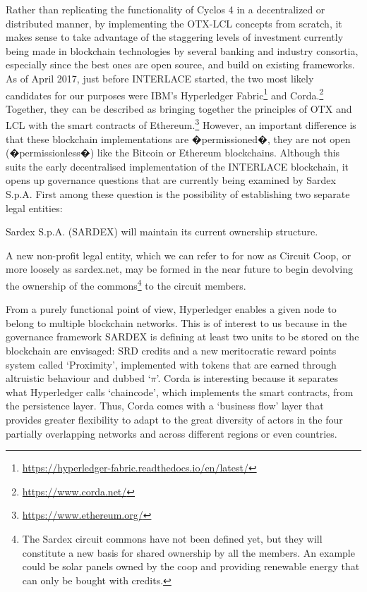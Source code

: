 Rather than replicating the functionality of Cyclos 4 in a decentralized or distributed manner, by implementing the OTX-LCL concepts from scratch, it makes sense to take advantage of the staggering levels of investment currently being made in blockchain technologies by several banking and industry consortia, especially since the best ones are open source, and build on existing frameworks. As of April 2017, just before INTERLACE started, the two most likely candidates for our purposes were IBM's Hyperledger Fabric\footnote{\url{https://hyperledger-fabric.readthedocs.io/en/latest/}}\cite{Cachin2016} and Corda.\footnote{\url{https://www.corda.net/}} Together, they can be described as bringing together the principles of OTX and LCL with the smart contracts of Ethereum.\footnote{\url{https://www.ethereum.org/}} However, an important difference is that these blockchain implementations are �permissioned�, they are not open (�permissionless�) like the Bitcoin or Ethereum blockchains. Although this suits the early decentralised implementation of the INTERLACE blockchain, it opens up governance questions that are currently being examined by Sardex S.p.A. First among these question is the possibility of establishing two separate legal entities:
\begin{packed_item1}
\item Sardex S.p.A. (SARDEX) will maintain its current ownership structure.
\item A new non-profit legal entity, which we can refer to for now as Circuit Coop, or more loosely as sardex.net, may be formed in the near future to begin devolving the ownership of the commons\footnote{The Sardex circuit commons have not been defined yet, but they will constitute a new basis for shared ownership by all the members. An example could be solar panels owned by the coop and providing renewable energy that can only be bought with credits.} to the circuit members.
\end{packed_item1}

From a purely functional point of view, Hyperledger enables a given node to belong to multiple blockchain networks. This is of interest to us because in the governance framework SARDEX is defining at least two units to be stored on the blockchain are envisaged: SRD credits and a new meritocratic reward points system called `Proximity', implemented with tokens that are earned through altruistic behaviour and dubbed `$\pi$'. Corda is interesting because it separates what Hyperledger calls `chaincode', which implements the smart contracts, from the persistence layer. Thus, Corda comes with a `business flow' layer that provides greater flexibility to adapt to the great diversity of actors in the four partially overlapping networks and across different regions or even countries.

